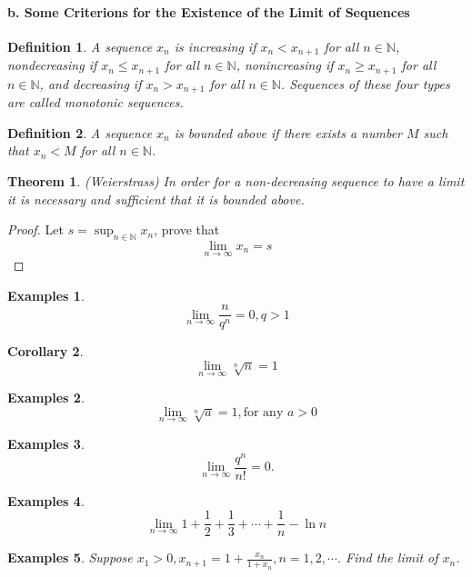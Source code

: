 \documentclass[a4paper,12pt]{article} %
\newtheorem{definition}{Definition}[section]
\newtheorem{theorem}{Theorem}[section]
\newtheorem{corollary}[theorem]{Corollary}
\newtheorem{example}{Examples}
\begin{document}
\paragraph{{\rm \textbf{b. Some Criterions for the Existence of the Limit 
of Sequences}}}
\begin{definition}
    A sequence ${x_n}$ is increasing if $x_n < x_{n+1}$ for all $n \in \mathbb{N}$,
    nondecreasing if $x_n \le x_{n+1}$ for all $n \in \mathbb{N}$,
    nonincreasing if $x_n \ge x_{n+1}$ for all $n \in \mathbb{N}$, and 
    decreasing if $x_n > x_{n+1}$ for all $n \in \mathbb{N}$.
    Sequences of these four types are called monotonic sequences.
\end{definition}
\begin{definition}
    A sequence ${x_n}$ is bounded above if there exists a number $M$
    such that $x_n < M$ for all $n \in \mathbb{N}$.
\end{definition}
\begin{theorem}{(Weierstrass)}
    In order for a non-decreasing sequence to have a limit it is 
    necessary and sufficient that it is bounded above.
\end{theorem}
\begin{proof}
    Let $s = \sup_{n\in \mathbb{N}}x_n$, prove that 
    \[\lim_{n \to \infty}x_n = s \]
\end{proof}

\begin{example}
    \[\lim_{n \to \infty} \frac{n}{q^n} = 0, q>1\]
\end{example}
\begin{corollary}
    \[\lim_{n \to \infty} \sqrt[n]{n} = 1\]
\end{corollary}

\begin{example}
    \[\lim_{n \to \infty} \sqrt[n]{a} = 1,\text{for any } a>0\]
\end{example}

\begin{example}
    \[
        \lim_{n \to \infty} \frac{q^n}{n!} = 0.
        \]
\end{example}
\begin{example}
    \[\lim_{n \to \infty} 1+\frac{1}{2}+\frac{1}{3}+\cdots+\frac{1}{n}-\ln n \]
\end{example}

\begin{example}
    \emph{Suppose} $x_1 > 0, x_{n+1} = 1+\frac{x_n}{1+x_n}, n = 1,2,\cdots$.
    \emph{Find the limit of} $x_n$.
\end{example}
\end{document}

